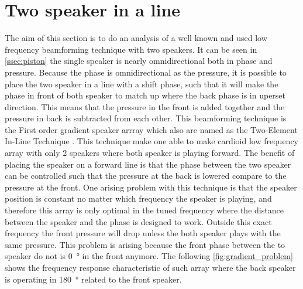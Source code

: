 \stopexplain



\section{Two speaker in a line}
The aim of this section is to do an analysis of a well known and used low frequency beamforming technique with two speakers. It can be seen in \autoref{ssec:piston} the single speaker is nearly omnidirectional both in phase and pressure. Because the phase is omnidirectional as the pressure, it is possible to place the two speaker in a line with a shift phase, such that it will make the phase in front of both speaker to match up where the back phase is in uperset  direction. This means that the pressure in the front is added together and the pressure in back is subtracted from each other. This beamforming technique is the First order gradient speaker arrray \citep{olson1973gradient} which also are named as the Two-Element In-Line Technique \citep{McCarthy2016}. This technique make one able to make cardioid low frequency array with only 2 speakers where both speaker is playing forward. The benefit of placing the speaker on a forward line is that the phase between the two speaker can be controlled such that the pressure at the back is lowered compare to the pressure at the front. One arising problem with this technique is that the speaker position is constant no matter which frequency the speaker is playing, and therefore this array is only optimal in the tuned frequency where the distance between the speaker and the phase is designed to work. Outside this exact frequency the front pressure will drop unless the both speaker plays with the same pressure. This problem is arising because the front phase between the to speaker do not is \SI{0}{\degree} in the front anymore. The following \autoref{fig:gradient_problem} shows the frequency response characteristic of such array where the back speaker is operating in \SI{180}{\degree} related to the front speaker.


